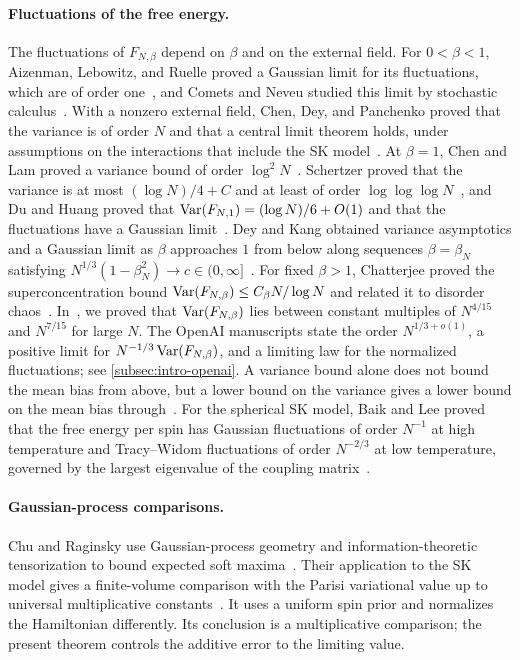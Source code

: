 \paragraph{Fluctuations of the free energy.}
The fluctuations of $F_{N,\beta}$ depend on $\beta$ and on the external
field. For $0<\beta<1$, Aizenman, Lebowitz, and Ruelle proved a
Gaussian limit for its fluctuations, which are of order
one~\cite{AizenmanLebowitzRuelle1987}, and Comets and Neveu studied this
limit by stochastic calculus~\cite{CometsNeveu1995}. With a nonzero
external field, Chen, Dey, and Panchenko proved that the variance is of
order $N$ and that a central limit theorem holds, under assumptions on
the interactions that include the SK
model~\cite[Theorems~1 and~2]{ChenDeyPanchenko2017}. At $\beta=1$, Chen
and Lam proved a variance bound of order
$\log^2N$~\cite[Theorem~1.1]{ChenLam2019}. Schertzer proved that the
variance is at most $(\log N)/4+C$ and at least of order
$\log\log\log N$~\cite[Theorems~1 and~2]{Schertzer2026Critical}, and Du
and Huang proved that $\operatorname{Var}(F_{N,1})=(\log N)/6+O(1)$ and that the
fluctuations have a Gaussian limit~\cite[Theorem~1.3]{DuHuang2026}. Dey and Kang obtained
variance asymptotics and a Gaussian limit as $\beta$ approaches $1$ from
below along sequences $\beta=\beta_N$ satisfying
$N^{1/3}(1-\beta_N^2)\to c\in(0,\infty]$~\cite[Theorem~1.1]{DeyKang2026}.
For fixed $\beta>1$, Chatterjee proved the superconcentration bound
$\operatorname{Var}(F_{N,\beta})\le C_\beta N/\log N$ and related it to disorder
chaos~\cite[Theorem~1.5]{Chatterjee2009Chaos}. In~\cite[Theorem~1.4]{AL},
we proved that $\operatorname{Var}(F_{N,\beta})$ lies between constant multiples of
$N^{4/15}$ and $N^{7/15}$ for large $N$. The OpenAI manuscripts state
the order $N^{1/3+o(1)}$, a positive limit for
$N^{-1/3}\operatorname{Var}(F_{N,\beta})$, and a limiting law for the normalized
fluctuations; see \cref{subsec:intro-openai}. A variance bound alone
does not bound the mean bias from above, but a lower bound on the
variance gives a lower bound on the mean bias
through~\cite[Lemma~7.4]{AL}. For the spherical SK model, Baik and Lee
proved that the free energy per spin has Gaussian fluctuations of order
$N^{-1}$ at high temperature and Tracy--Widom fluctuations of order
$N^{-2/3}$ at low temperature, governed by the largest eigenvalue of
the coupling matrix~\cite[Theorems~2.10 and~2.11]{BaikLee2016}.

\paragraph{Gaussian-process comparisons.}
Chu and Raginsky use Gaussian-process geometry and information-theoretic
tensorization to bound expected soft maxima~\cite{ChuRaginsky2026}.
Their application to the SK model gives a finite-volume comparison with the Parisi
variational value up to universal multiplicative
constants~\cite[Section~6, Theorem~10]{ChuRaginsky2026}.
It uses a uniform spin prior and normalizes the Hamiltonian differently.
Its conclusion is a multiplicative comparison; the present theorem
controls the additive error to the limiting value.

